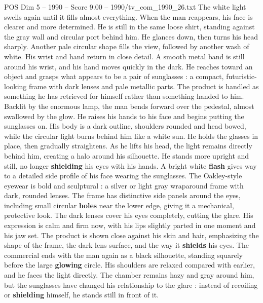 \begin{textsample}{POS Dim 5 – 1990 – Score 9.00 – 1990/tv\_com\_1990\_26.txt}
The white light swells again until it fills almost everything.
When the man reappears, his face is clearer and more determined.
He is still in the same loose shirt, standing against the gray wall and circular port behind him.
He glances down, then turns his head sharply.
Another pale circular shape fills the view, followed by another wash of white.
His wrist and hand return in close detail.
A smooth metal band is still around his wrist, and his hand moves quickly in the dark.
He reaches toward an object and grasps what appears to be a pair of sunglasses : a compact, futuristic-looking frame with dark lenses and pale metallic parts.
The product is handled as something he has retrieved for himself rather than something handed to him.
Backlit by the enormous lamp, the man bends forward over the pedestal, almost swallowed by the glow.
He raises his hands to his face and begins putting the sunglasses on.
His body is a dark outline, shoulders rounded and head bowed, while the circular light burns behind him like a white sun.
He holds the glasses in place, then gradually straightens.
As he lifts his head, the light remains directly behind him, creating a halo around his silhouette.
He stands more upright and still, no longer \textbf{shielding} his eyes with his hands.
A bright white \textbf{flash} gives way to a detailed side profile of his face wearing the sunglasses.
The Oakley-style eyewear is bold and sculptural : a silver or light gray wraparound frame with dark, rounded lenses.
The frame has distinctive side panels around the eyes, including small circular \textbf{holes} near the lower edge, giving it a mechanical, protective look.
The dark lenses cover his eyes completely, cutting the glare.
His expression is calm and firm now, with his lips slightly parted in one moment and his jaw set.
The product is shown close against his skin and hair, emphasizing the shape of the frame, the dark lens surface, and the way it \textbf{shields} his eyes.
The commercial ends with the man again as a black silhouette, standing squarely before the large \textbf{glowing} circle.
His shoulders are relaxed compared with earlier, and he faces the light directly.
The chamber remains hazy and gray around him, but the sunglasses have changed his relationship to the glare : instead of recoiling or \textbf{shielding} himself, he stands still in front of it.

\end{textsample}
